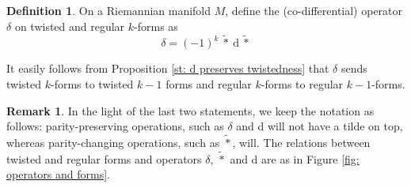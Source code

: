 \documentclass[11pt,twoside]{article}
\theoremstyle{definition}
\newtheorem{Def}[theorem]{Definition}
\newtheorem{rem}[theorem]{Remark}
\numberwithin{equation}{section}
\begin{document}
\begin{Def}
\label{def: deltatilde}
    On a Riemannian manifold $M$, define the (co-differential) operator ${\delta}$ on twisted and regular $k$-forms as
    \begin{equation}
        \label{eq: deltatilde}
       {\delta} = (-1)^{k}\ \widetilde{\ast}\ \mathrm{d}\ \widetilde{\ast}
    \end{equation}
\end{Def}
It easily follows from Proposition \ref{st: d preserves twistedness} that ${\delta}$ sends twisted $k$-forms to twisted $k-1$ forms and regular $k$-forms to regular $k-1$-forms. 

\begin{rem}
    In the light of the last two statements, we keep the notation as follows: parity-preserving operations, such as $\delta$ and d will not have a tilde on top, whereas parity-changing operations, such as $\widetilde{\ast}$, will.  The relations between twisted and regular forms and operators $\delta$, $\widetilde{\ast}$ and d
 are as in Figure \ref{fig: operators and forms}.
\end{rem}
\end{document}
